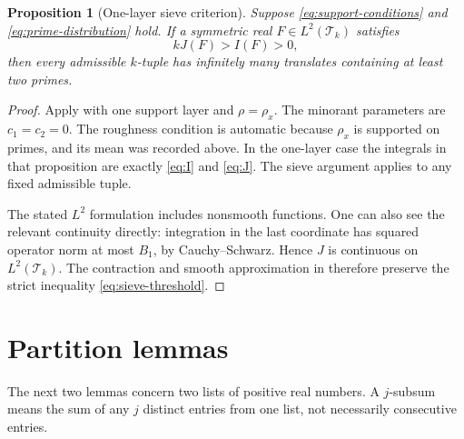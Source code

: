 \documentclass[11pt,reqno]{amsart}
\newtheorem{proposition}[theorem]{Proposition}
\theoremstyle{definition}
\theoremstyle{remark}
\numberwithin{equation}{section}
\newcommand{\Tset}{\mathcal T}
\begin{document}
\begin{proposition}[One-layer sieve criterion]\label{prop:sieve}
Suppose \eqref{eq:support-conditions} and
\eqref{eq:prime-distribution} hold. If a symmetric real
$F\in L^2(\Tset_k)$ satisfies
\begin{equation}\label{eq:sieve-threshold}
 kJ(F)>I(F)>0,
\end{equation}
then every admissible $k$-tuple has infinitely many translates
containing at least two primes.
\end{proposition}
\begin{proof}
Apply \cite[Proposition~1 and its proof]{Stadlmann26} with one support
layer and $\rho=\rho_x$. The minorant parameters are $c_1=c_2=0$.
The roughness condition is automatic because $\rho_x$ is supported on
primes, and its mean was recorded above. In the one-layer case the
integrals in that proposition are exactly \eqref{eq:I} and
\eqref{eq:J}. The sieve argument applies to any fixed admissible tuple.

The stated $L^2$ formulation includes nonsmooth functions. One can also
see the relevant continuity directly: integration in the last coordinate
has squared operator norm at most $B_1$, by Cauchy--Schwarz. Hence $J$ is
continuous on $L^2(\Tset_k)$. The contraction and smooth approximation in
\cite[Lemma~1]{Stadlmann26} therefore preserve the strict inequality
\eqref{eq:sieve-threshold}.
\end{proof}

\section{Partition lemmas}\label{sec:partition}
The next two lemmas concern two lists of positive real numbers. A
$j$-subsum means the sum of any $j$ distinct entries from one list, not
necessarily consecutive entries.
\end{document}
